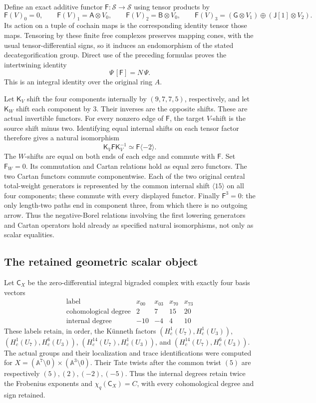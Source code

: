 Define an exact additive functor \(\mathsf F:\mathcal S\to\mathcal S\)
using tensor products by
\[
 \mathsf F(V)_0=0,\qquad
 \mathsf F(V)_1=\mathsf A\otimes V_0,\qquad
 \mathsf F(V)_2=\mathsf B\otimes V_0,\qquad
 \mathsf F(V)_3=(\mathsf G\otimes V_1)
                       \oplus(\mathsf J[1]\otimes V_2).
\]
Its action on a tuple of cochain maps is the corresponding identity
tensor those maps. Tensoring by these finite free complexes preserves
mapping cones, with the usual tensor-differential signs, so it induces
an endomorphism of the stated decategorification group. Direct use of
the preceding formulas proves the intertwining identity
\[
                 \Psi\,[\mathsf F]=N\,\Psi.
\]
This is an integral identity over the original ring \(A\).

Let \(\mathsf K_V\) shift the four components internally by
\((9,7,7,5)\), respectively, and let \(\mathsf K_W\) shift each
component by \(3\). Their inverses are the opposite shifts. These are
actual invertible functors. For every nonzero edge of \(\mathsf F\),
the target \(V\)-shift is the source shift minus two. Identifying equal
internal shifts on each tensor factor therefore gives a natural
isomorphism
\[
 \mathsf K_V\mathsf F\mathsf K_V^{-1}
                  \simeq\mathsf F\langle-2\rangle.
\]
The \(W\)-shifts are equal on both ends of each edge and commute
with \(\mathsf F\). Set \(\mathsf F_W=0\). Its commutation and
Cartan relations hold as equal zero functors. The two Cartan functors
commute componentwise. Each of the two original central total-weight
generators is represented by the common internal shift \(\langle15\rangle\)
on all four components; these commute with every displayed functor.
Finally \(\mathsf F^3=0\): the only length-two
paths end in component three, from which there is no outgoing arrow.
Thus the negative-Borel relations involving the first lowering
generators and Cartan operators hold already as specified natural
isomorphisms, not only as scalar equalities.

\subsection{The retained geometric scalar object}

Let \(\mathsf C_X\) be the zero-differential integral bigraded complex
with exactly four basis vectors
\[
\begin{array}{c|rrrr}
\text{label}&x_{00}&x_{03}&x_{70}&x_{73}\\\hline
\text{cohomological degree}&2&7&15&20\\
\text{internal degree}&-10&-4&4&10
\end{array}
\]
These labels retain, in order, the K\"unneth factors
\((H^1_c(U_7),H^1_c(U_3))\),
\((H^1_c(U_7),H^6_c(U_3))\),
\((H^{14}_c(U_7),H^1_c(U_3))\), and
\((H^{14}_c(U_7),H^6_c(U_3))\).
The actual groups and their localization and trace identifications
were computed for
\(X=(\mathbb A^7\setminus0)\times(\mathbb A^3\setminus0)\).
Their Tate twists after the common twist \((5)\) are respectively
\((5),(2),(-2),(-5)\). Thus the internal degrees retain twice the
Frobenius exponents and \(\chi_q(\mathsf C_X)=C\), with every
cohomological degree and sign retained.

